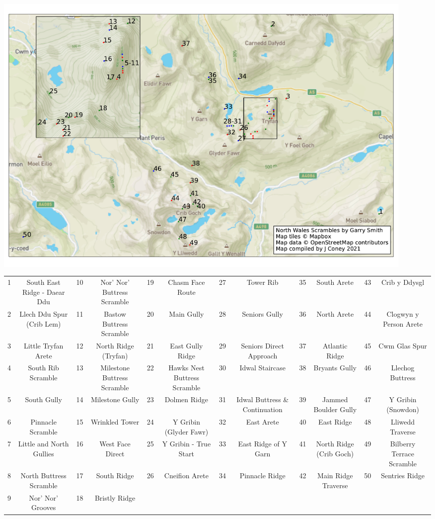\documentclass{article}
\begin{document}
\begin{centering}
\includegraphics[width=210mm]{scrambles_summits2.pdf}

\tiny
\begin{tabular}{cc|cc|cc|cc|cc|cc}
1&	South East Ridge - Daear Ddu &	10	&Nor' Nor' Buttress Scramble&	19&	Chasm Face Route&	27&	Tower Rib&	35&	South Arete	&43&	Crib y Ddysgl\\
2&	Llech Ddu Spur (Crib Lem)&	11&	Bastow Buttress Scramble&	20&	Main Gully&	28&	Seniors Gully&	36&	North Arete&	44&	Clogwyn y Person Arete\\
3&	Little Tryfan Arete&	12&	North Ridge (Tryfan)&	21&	East Gully Ridge&	29&	Seniors Direct Approach&	37&	Atlantic Ridge&	45&	Cwm Glas Spur\\
4&	South Rib Scramble&	13&	Milestone Buttress Scramble&	22&	Hawks Nest Buttress Scramble&	30&	Idwal Staircase&	38&	Bryants Gully&	46&	Llechog Buttress\\
5&	South Gully	&14&	Milestone Gully	&23&	Dolmen Ridge&	31&	Idwal Buttress \& Continuation&	39&	Jammed Boulder Gully&	47&	Y Gribin (Snowdon)\\
6&	Pinnacle Scramble&	15&	Wrinkled Tower&	24&	Y Gribin (Glyder Fawr)&	32&	East Arete&	40&	East Ridge&	48&	Lliwedd Traverse\\
7&	Little and North Gullies&	16&	West Face Direct&	25&	Y Gribin - True Start&	33&	East Ridge of Y Garn&	41&	North Ridge (Crib Goch)&	49&	Bilberry Terrace Scramble\\
8&	North Buttress Scramble&	17	&South Ridge	&26&	Cneifion Arete	&34	&Pinnacle Ridge	&42	&Main Ridge Traverse	&50&	Sentries Ridge\\
9&	Nor' Nor' Grooves&	18&	Bristly Ridge\\

\end{tabular}


\end{centering}
\end{document}

